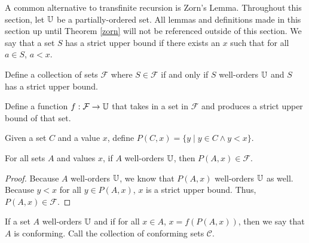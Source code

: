 \documentclass[../math.tex]{subfiles}
\begin{document}
A common alternative to transfinite recursion is Zorn's Lemma.  Throughout this
section, let $\mathbb{U}$ be a partially-ordered set.  All lemmas and definitions made
in this section up until Theorem \ref{zorn} will not be referenced outside of
this section.  We say that a set $S$ has a strict upper bound if there exists an
$x$ such that for all $a \in S$, $a < x$.

\begin{definition}
    Define a collection of sets $\mathcal F$ where $S \in \mathcal F$ if and
    only if $S$ well-orders $\mathbb{U}$ and $S$ has a strict upper bound.
\end{definition}

\begin{definition}
    Define a function $f : \mathcal F \rightarrow \mathbb{U}$ that takes in a set in
    $\mathcal F$ and produces a strict upper bound of that set.
\end{definition}

\begin{definition}
    Given a set $C$ and a value $x$, define $P(C, x) = \{y \mid y \in C \wedge y
    < x\}$.
\end{definition}

\begin{lemma}
    For all sets $A$ and values $x$, if $A$ well-orders $\mathbb{U}$, then $P(A, x) \in
    \mathcal F$.
\end{lemma}
\begin{proof}
    Because $A$ well-orders $\mathbb{U}$, we know that $P(A, x)$ well-orders $\mathbb{U}$ as
    well.  Because $y < x$ for all $y \in P(A, x)$, $x$ is a strict upper bound.
    Thus, $P(A, x) \in \mathcal F$.
\end{proof}

\begin{definition}
    If a set $A$ well-orders $\mathbb{U}$ and if for all $x \in A$, $x = f(P(A, x))$,
    then we say that $A$ is conforming.  Call the collection of conforming sets
    $\mathcal C$.
\end{definition}
\end{document}

